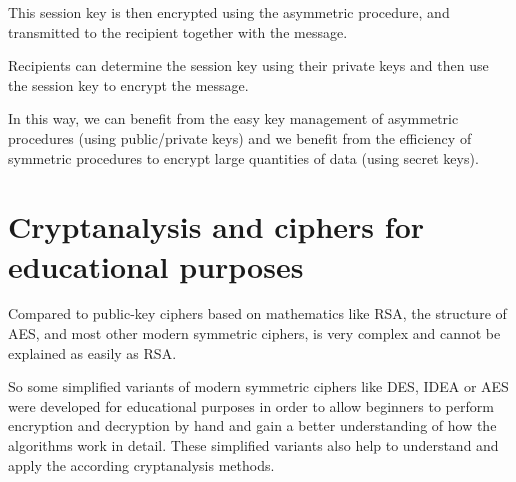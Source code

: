 This session key is then encrypted using the asymmetric procedure, and
transmitted to the recipient together with the message.

Recipients can determine the session key using their private keys and
then use the session key to encrypt the message.

In this way, we can benefit from the easy key management
of asymmetric procedures (using public/private keys) and we benefit from the
efficiency of symmetric procedures to encrypt large quantities of data
(using secret keys).



\newpage
\begin{center}
\end{center}
\addtocounter{footnote}{0}
\section{Cryptanalysis and ciphers for educational purposes} 

Compared to public-key ciphers based on mathematics like RSA, the structure of AES,
and most other modern symmetric ciphers, is very complex and cannot be explained
as easily as RSA.

So some simplified variants of modern symmetric ciphers like DES, IDEA or AES
were developed for educational purposes in order to allow beginners to perform
encryption and decryption by hand and gain a better understanding of how the
algorithms work in detail.
These simplified variants also help to understand and apply the according
cryptanalysis methods.

